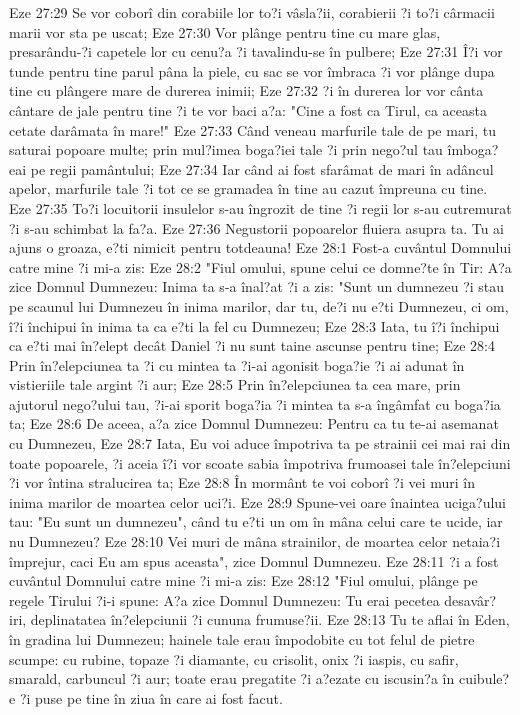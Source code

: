 Eze 27:29  Se vor coborî din corabiile lor to?i vâsla?ii, corabierii ?i to?i cârmacii marii vor sta pe uscat;
Eze 27:30  Vor plânge pentru tine cu mare glas, presarându-?i capetele lor cu cenu?a ?i tavalindu-se în pulbere;
Eze 27:31  Î?i vor tunde pentru tine parul pâna la piele, cu sac se vor îmbraca ?i vor plânge dupa tine cu plângere mare de durerea inimii;
Eze 27:32  ?i în durerea lor vor cânta cântare de jale pentru tine ?i te vor baci a?a: "Cine a fost ca Tirul, ca aceasta cetate darâmata în mare!"
Eze 27:33  Când veneau marfurile tale de pe mari, tu saturai popoare multe; prin mul?imea boga?iei tale ?i prin nego?ul tau îmboga?eai pe regii pamântului;
Eze 27:34  Iar când ai fost sfarâmat de mari în adâncul apelor, marfurile tale ?i tot ce se gramadea în tine au cazut împreuna cu tine.
Eze 27:35  To?i locuitorii insulelor s-au îngrozit de tine ?i regii lor s-au cutremurat ?i s-au schimbat la fa?a.
Eze 27:36  Negustorii popoarelor fluiera asupra ta. Tu ai ajuns o groaza, e?ti nimicit pentru totdeauna!
Eze 28:1  Fost-a cuvântul Domnului catre mine ?i mi-a zis:
Eze 28:2  "Fiul omului, spune celui ce domne?te în Tir: A?a zice Domnul Dumnezeu: Inima ta s-a înal?at ?i a zis: "Sunt un dumnezeu ?i stau pe scaunul lui Dumnezeu în inima marilor, dar tu, de?i nu e?ti Dumnezeu, ci om, î?i închipui în inima ta ca e?ti la fel cu Dumnezeu;
Eze 28:3  Iata, tu î?i închipui ca e?ti mai în?elept decât Daniel ?i nu sunt taine ascunse pentru tine;
Eze 28:4  Prin în?elepciunea ta ?i cu mintea ta ?i-ai agonisit boga?ie ?i ai adunat în vistieriile tale argint ?i aur;
Eze 28:5  Prin în?elepciunea ta cea mare, prin ajutorul nego?ului tau, ?i-ai sporit boga?ia ?i mintea ta s-a îngâmfat cu boga?ia ta;
Eze 28:6  De aceea, a?a zice Domnul Dumnezeu: Pentru ca tu te-ai asemanat cu Dumnezeu,
Eze 28:7  Iata, Eu voi aduce împotriva ta pe strainii cei mai rai din toate popoarele, ?i aceia î?i vor scoate sabia împotriva frumoasei tale în?elepciuni ?i vor întina stralucirea ta;
Eze 28:8  În mormânt te voi coborî ?i vei muri în inima marilor de moartea celor uci?i.
Eze 28:9  Spune-vei oare înaintea uciga?ului tau: "Eu sunt un dumnezeu", când tu e?ti un om în mâna celui care te ucide, iar nu Dumnezeu?
Eze 28:10  Vei muri de mâna strainilor, de moartea celor netaia?i împrejur, caci Eu am spus aceasta", zice Domnul Dumnezeu.
Eze 28:11  ?i a fost cuvântul Domnului catre mine ?i mi-a zis:
Eze 28:12  "Fiul omului, plânge pe regele Tirului ?i-i spune: A?a zice Domnul Dumnezeu: Tu erai pecetea desavâr?iri, deplinatatea în?elepciunii ?i cununa frumuse?ii.
Eze 28:13  Tu te aflai în Eden, în gradina lui Dumnezeu; hainele tale erau împodobite cu tot felul de pietre scumpe: cu rubine, topaze ?i diamante, cu crisolit, onix ?i iaspis, cu safir, smarald, carbuncul ?i aur; toate erau pregatite ?i a?ezate cu iscusin?a în cuibule?e ?i puse pe tine în ziua în care ai fost facut.
